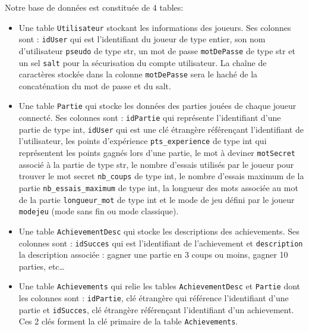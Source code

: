 Notre base de données est constituée de 4 tables:
\vspace*{0.5cm}
\begin{itemize}
    \item Une table \texttt{Utilisateur} stockant les informations des joueurs. Ses colonnes sont : \texttt{idUser} qui est l’identifiant du joueur de type entier, son nom d'utilisateur \texttt{pseudo} de type str, un mot de passe \texttt{motDePasse} de type str et un sel  \texttt{salt} pour la sécurisation du compte utilisateur. La chaîne de caractères stockée dans la colonne \texttt{motDePasse} sera le haché de la concaténation du mot de passe et du salt.
     \vspace*{0.2cm}
    
    \item Une table \texttt{Partie} qui stocke les données des parties jouées de chaque joueur connecté. Ses colonnes sont : \texttt{idPartie} qui représente l’identifiant d’une partie de type int, \texttt{idUser} qui est une clé étrangère référençant l'identifiant de l'utilisateur, les points d'expérience \texttt{pts\_experience} de type int qui représentent les points gagnés lors d’une partie, le mot à deviner \texttt{motSecret} associé à la partie de type str, le nombre d'essais utilisés par le joueur pour trouver le mot secret \texttt{nb\_coups} de type int, le nombre d’essais maximum de la partie \texttt{nb\_essais\_maximum} de type int, la longueur des mots associée au mot de la partie \texttt{longueur\_mot} de type int et le mode de jeu défini par le joueur \texttt{modejeu} (mode sans fin ou mode classique).
     \vspace*{0.2cm}
    
    \item Une table \texttt{AchievementDesc} qui stocke les descriptions des achievements. Ses colonnes sont : \texttt{idSucces} qui est l’identifiant de l’achievement et \texttt{description} la description associée : gagner une partie en 3 coups ou moins, gagner 10 parties, etc\dots{}
     \vspace*{0.2cm}
    
    \item Une table \texttt{Achievements} qui relie les tables \texttt{AchievementDesc} et \texttt{Partie} dont les colonnes sont : \texttt{idPartie}, clé étrangère qui référence l'identifiant d'une partie et \texttt{idSucces}, clé étrangère référençant l'identifiant d'un achievement. Ces 2 clés forment la clé primaire de la table \texttt{Achievements}.
\end{itemize}

